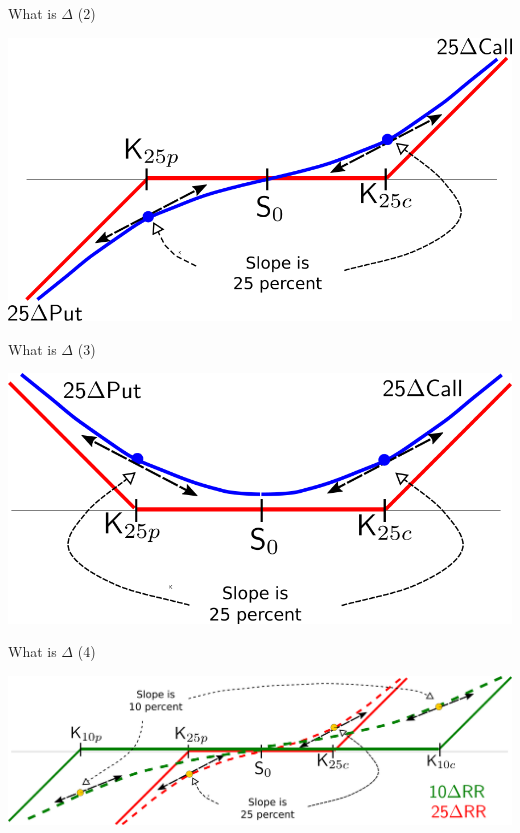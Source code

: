 \begin{frame}{What is \(\Delta\) (2)}

\begin{center}\includegraphics[width=0.8\linewidth]{images/fig25RR} \end{center}

\end{frame}

\begin{frame}{What is \(\Delta\) (3)}

\begin{center}\includegraphics[width=0.8\linewidth]{images/fig25Strangle} \end{center}

\end{frame}

\begin{frame}{What is \(\Delta\) (4)}

\begin{center}\includegraphics[width=1\linewidth]{images/fig1025RR} \end{center}

\end{frame}

